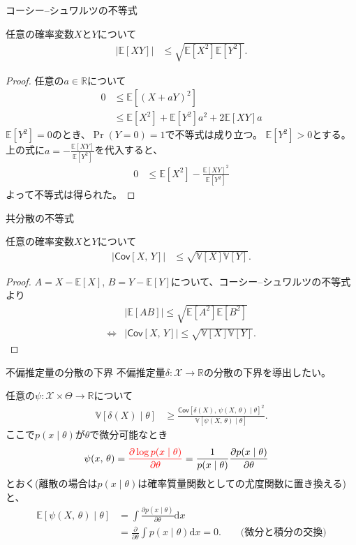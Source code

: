 \documentclass[lualatex,handout]{beamer}
\newcommand{\mycolor}[2]{%
  \begingroup
  \colorlet{currentcolor}{.}%
  \color{#1}#2%
  \color{currentcolor}%
  \endgroup
}
\newcommand{\emm}[1]{\mycolor{red}{#1}}
\newcommand{\expt}[1]{\mathbb{E}\left[#1\right]}
\newcommand{\var}[1]{\mathbb{V}\left[#1\right]}
\newcommand{\cov}[1]{\mathsf{Cov}\left[#1\right]}
\theoremstyle{definition}
\begin{document}
\begin{frame}{コーシー--シュワルツの不等式}
\small
\begin{lemma}
任意の確率変数$X$と$Y$について
\begin{align*}
|\expt{XY}|&\le\sqrt{\expt{X^2}\expt{Y^2}}.
\end{align*}
\end{lemma}
\begin{proof}
任意の$a\in\mathbb{R}$について
\begin{align*}
0&\le\expt{(X+aY)^2}\\
&\le\expt{X^2}+\expt{Y^2}a^2+2\expt{XY}a
\end{align*}
$\expt{Y^2}=0$のとき、$\Pr(Y=0)=1$で不等式は成り立つ。
$\expt{Y^2}>0$とする。
上の式に$a=-\frac{\expt{XY}}{\expt{Y^2}}$を代入すると、
\begin{align*}
0&\le \expt{X^2} - \frac{\expt{XY}^2}{\expt{Y^2}}
\end{align*}
よって不等式は得られた。
\end{proof}
\end{frame}

\begin{frame}{共分散の不等式}
\small
\begin{corollary}
任意の確率変数$X$と$Y$について
\begin{align*}
|\cov{X,\,Y}|&\le\sqrt{\var{X}\var{Y}}.
\end{align*}
\end{corollary}
\begin{proof}
$A= X - \expt{X}$,
$B= Y - \expt{Y}$について、コーシー--シュワルツの不等式より
\begin{align*}
&|\expt{AB}|\le\sqrt{\expt{A^2}\expt{B^2}}\\
\iff&|\cov{X,\,Y}|\le\sqrt{\var{X}\var{Y}}.
\end{align*}
\end{proof}
\end{frame}

\begin{frame}{不偏推定量の分散の下界}
不偏推定量$\delta\colon\mathcal{X}\to\mathbb{R}$の分散の下界を導出したい。

\vspace{1em}
任意の$\psi\colon\mathcal{X}\times\Theta\to\mathbb{R}$について
\begin{align*}
\var{\delta(X)\mid\theta}&\ge\frac{\cov{\delta(X),\,\psi(X,\,\theta)\mid\theta}^2}{\var{\psi(X,\,\theta)\mid\theta}}.
\end{align*}
ここで$p(x\mid\theta)$が$\theta$で微分可能なとき
\begin{align*}
\psi(x,\,\theta)&
=\emm{\frac{\partial\log p(x\mid\theta)}{\partial\theta}}
=\frac1{p(x\mid\theta)}\frac{\partial p(x\mid\theta)}{\partial\theta}
\end{align*}
とおく(離散の場合は$p(x\mid\theta)$は確率質量関数としての尤度関数に置き換える)と、
\begin{align*}
\expt{\psi(X,\,\theta)\mid\theta}&= \int \frac{\partial p(x\mid\theta)}{\partial\theta}\mathrm{d}x\\
&= \frac{\partial }{\partial\theta}\int p(x\mid\theta)\mathrm{d}x=0.\qquad\text{(微分と積分の交換)}
\end{align*}
\end{frame}
\end{document}
